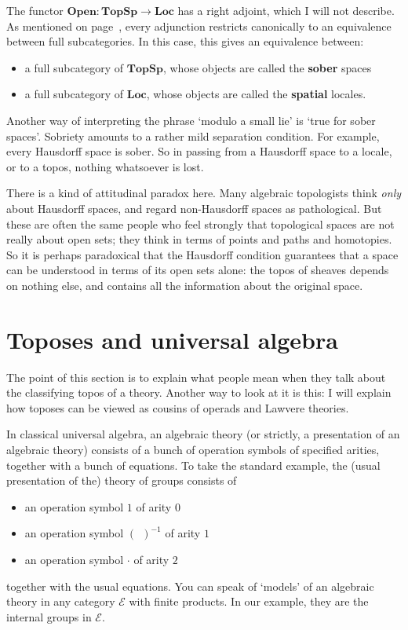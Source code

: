 \documentclass[12pt]{article}
\newcommand{\emptybk}{\:\:}
\newcommand{\blank}{(\emptybk)}
\newcommand{\cat}[1]{\mathscr{#1}}
\newcommand{\fcat}[1]{\mathbf{#1}}
\newcommand{\demph}[1]{\textbf{\textup{#1}}}
\newcommand{\E}{\cat{E}}
\newcommand{\Open}{\fcat{Open}}
\newcommand{\TopSp}{\fcat{TopSp}}
\newcommand{\Loc}{\fcat{Loc}}
\newcommand{\cln}{\colon}
\begin{document}
The functor $\Open\cln \TopSp \to \Loc$ has a right adjoint, which I will not
describe.  As mentioned on page~\pageref{p:adjn-eqv}, every adjunction
restricts canonically to an equivalence between full subcategories.  In this
case, this gives an equivalence between:
% 
\begin{itemize}
\item a full subcategory of $\TopSp$, whose objects are called the
\demph{sober} spaces
\item a full subcategory of $\Loc$, whose objects are called the
\demph{spatial} locales.
\end{itemize}
% 
Another way of interpreting the phrase `modulo a small lie' is `true for sober
spaces'.  Sobriety amounts to a rather mild separation condition.  For
example, every Hausdorff space is sober.  So in passing from a Hausdorff space
to a locale, or to a topos, nothing whatsoever is lost.

There is a kind of attitudinal paradox here.  Many algebraic topologists think
\emph{only} about Hausdorff spaces, and regard non-Hausdorff spaces as
pathological.  But these are often the same people who feel strongly that
topological spaces are not really about open sets; they think in terms of
points and paths and homotopies.  So it is perhaps paradoxical that the
Hausdorff condition guarantees that a space can be understood in terms of
its open sets alone: the topos of sheaves depends on nothing else, and
contains all the information about the original space.



\section{Toposes and universal algebra}
\label{sec:univ-alg}



The point of this section is to explain what people mean when they talk about
the classifying topos of a theory.  Another way to look at it is this: I will
explain how toposes can be viewed as cousins of operads and Lawvere theories.

In classical universal algebra, an algebraic theory (or strictly, a
presentation of an algebraic theory) consists of a bunch of operation symbols
of specified arities, together with a bunch of equations.  To take the
standard example, the (usual presentation of the) theory of groups consists of
% 
\begin{itemize}
\item an operation symbol $1$ of arity $0$
\item an operation symbol $\blank^{-1}$ of arity $1$
\item an operation symbol $\cdot$ of arity $2$
\end{itemize}
% 
together with the usual equations.  You can speak of `models' of an algebraic
theory in any category $\E$ with finite products.  In our example, they are
the internal groups in $\E$.
\end{document}
